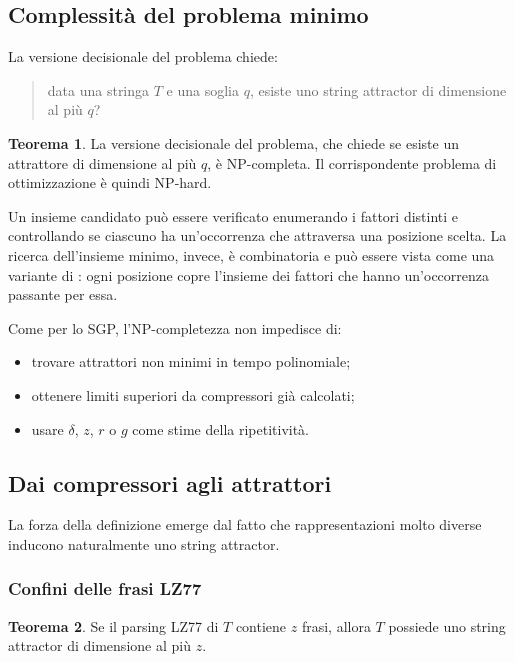 \documentclass{article}
\theoremstyle{definition}
\newtheorem{theorem}{Teorema}[section] %
\numberwithin{equation}{section}
\begin{document}
\subsection{Complessità del problema minimo}
La versione decisionale del problema chiede:
\begin{quote}
    data una stringa $T$ e una soglia $q$, esiste uno string attractor di
    dimensione al più $q$?
\end{quote}

\begin{theorem}\label{theorem_minimum_attractor_np_complete}
    La versione decisionale del problema, che chiede se esiste un attrattore di
    dimensione al più $q$, è NP-completa. Il corrispondente problema di
    ottimizzazione è quindi NP-hard.
\end{theorem}

Un insieme candidato può essere verificato enumerando i fattori distinti e
controllando se ciascuno ha un'occorrenza che attraversa una posizione scelta.
La ricerca dell'insieme minimo, invece, è combinatoria e può essere vista come
una variante di : ogni posizione copre l'insieme dei fattori
che hanno un'occorrenza passante per essa.

Come per lo SGP, l'NP-completezza non impedisce di:
\begin{itemize}
    \item trovare attrattori non minimi in tempo polinomiale;
    \item ottenere limiti superiori da compressori già calcolati;
    \item usare $\delta$, $z$, $r$ o $g$ come stime della ripetitività.
\end{itemize}

\subsection{Dai compressori agli attrattori}
La forza della definizione emerge dal fatto che rappresentazioni molto diverse
inducono naturalmente uno string attractor.

\subsubsection{Confini delle frasi LZ77}
\begin{theorem}\label{theorem_lz77_induces_attractor}
    Se il parsing LZ77 di $T$ contiene $z$ frasi, allora $T$ possiede uno string
    attractor di dimensione al più $z$.
\end{theorem}
\end{document}
